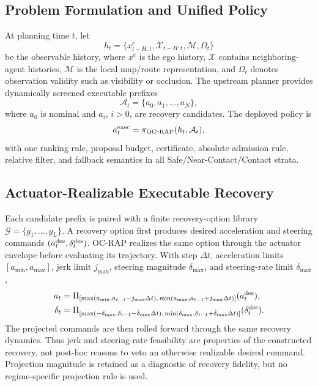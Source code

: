 \documentclass[conference]{IEEEtran}
\begin{document}
\subsection{Problem Formulation and Unified Policy}
\label{subsec:problem}
At planning time $t$, let
\begin{equation}
    h_t=\{x^e_{t-H:t},\mathcal{X}_{t-H:t},\mathcal{M},\Omega_t\}
\end{equation}
be the observable history, where $x^e$ is the ego history, $\mathcal{X}$ contains neighboring-agent histories, $\mathcal{M}$ is the local map/route representation, and $\Omega_t$ denotes observation validity such as visibility or occlusion. The upstream planner provides dynamically screened executable prefixes
\begin{equation}
    \mathcal{A}_t=\{a_0,a_1,\ldots,a_N\},
\end{equation}
where $a_0$ is nominal and $a_i$, $i>0$, are recovery candidates. The deployed policy is
\begin{equation}
    a_t^{\rm exec}=\pi_{\rm OC\mbox{-}RAP}(h_t,\mathcal{A}_t),
    \label{eq:regime_agnostic}
\end{equation}
with one ranking rule, proposal budget, certificate, absolute admission rule, relative filter, and fallback semantics in all Safe/Near-Contact/Contact strata.

\subsection{Actuator-Realizable Executable Recovery}
\label{subsec:actuator_recovery}
Each candidate prefix is paired with a finite recovery-option library $\mathcal{G}=\{g_1,\ldots,g_L\}$. A recovery option first produces desired acceleration and steering commands $(a_t^{\rm des},\delta_t^{\rm des})$. OC-RAP realizes the same option through the actuator envelope before evaluating its trajectory. With step $\Delta t$, acceleration limits $[a_{\min},a_{\max}]$, jerk limit $j_{\max}$, steering magnitude $\delta_{\max}$, and steering-rate limit $\dot\delta_{\max}$,
\begin{align}
 a_t &= \Pi_{[\max(a_{\min},a_{t-1}-j_{\max}\Delta t),\,
                    \min(a_{\max},a_{t-1}+j_{\max}\Delta t)]}(a_t^{\rm des}),\\
 \delta_t &= \Pi_{[\max(-\delta_{\max},\delta_{t-1}-\dot\delta_{\max}\Delta t),\,
                         \min(\delta_{\max},\delta_{t-1}+\dot\delta_{\max}\Delta t)]}(\delta_t^{\rm des}).
 \label{eq:actuator_projection}
\end{align}
The projected commands are then rolled forward through the same recovery dynamics. Thus jerk and steering-rate feasibility are properties of the constructed recovery, not post-hoc reasons to veto an otherwise realizable desired command. Projection magnitude is retained as a diagnostic of recovery fidelity, but no regime-specific projection rule is used.
\end{document}
